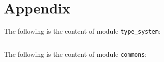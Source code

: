 

\section{Appendix}
\label{sec:appendix}

The following is the content of module \Verb|type_system|:
\inputminted[baselinestretch=0.8,stripnl=false]{python}{type-system.py}

The following is the content of module \Verb|commons|:
\inputminted[baselinestretch=0.8,stripnl=false]{python}{../../src/commons.py}
